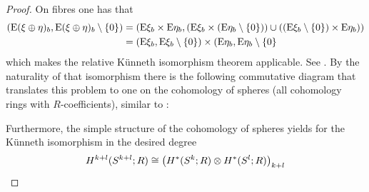 \begin{Cor}
\begin{proof}
    On fibres one has that
    \begin{align*}
      (\mathrm{E}(\xi\oplus\eta)_b, {\mathrm{E}(\xi\oplus\eta)_b}\setminus\{0\})
      &= \left(
        \mathrm{E}\xi_b\times\mathrm{E}\eta_b,
        \left(\mathrm{E}\xi_b\times({\mathrm{E}\eta_b}\setminus\{0\})\right)
        \cup
        \left(({\mathrm{E}\xi_b}\setminus\{0\})\times\mathrm{E}\eta_b\right)
        \right)
        \\
      &= (\mathrm{E}\xi_b, {\mathrm{E}\xi_b}\setminus\{0\})\times(\mathrm{E}\eta_b, {\mathrm{E}\eta_b}\setminus\{0\}
    \end{align*}
    which makes the relative Künneth isomorphism theorem applicable.
    See \forexample \cite[Theorem~3.18]{hatcher}.
    By the naturality of that isomorphism there is the
    following commutative diagram that translates this problem to one
    on the cohomology of spheres (all cohomology rings with
    $R$-coefficients),
    similar to \cite[proof of Theorem~3.19, p.~221]{hatcher}:
    \begin{center}
    \end{center}
    Furthermore, the simple structure of the cohomology of spheres
    yields for the Künneth isomorphism in the desired degree
    \begin{align*}
      \H^{\rkk+\rkl}(\Sphere{\rkk+\rkl};R)
      &\cong
        \left(\H^*(\Sphere{\rkk}; R)\otimes \H^*(\Sphere{\rkl}; R)\right)_{\rkk+\rkl}\\

\end{align*}
\end{proof}
\end{Cor}
